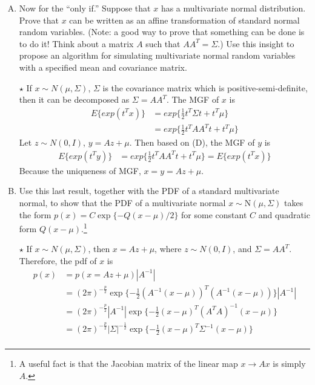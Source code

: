 \documentclass[11pt]{article}
\newcommand{\jie}{$\star$ }
\newcommand{\half}{\frac{1}{2}}
\newcommand{\N}{\mbox{N}}
\begin{document}
\begin{enumerate}[(A)]
\bigskip

\item Now for the ``only if.''  Suppose that $x$ has a multivariate normal distribution.  Prove that $x$ can be written as an affine transformation of standard normal random variables.  (Note: a good way to prove that something can be done is to do it!  Think about a matrix $A$ such that $A A^T = \Sigma$.)  Use this insight to propose an algorithm for simulating multivariate normal random variables with a specified mean and covariance matrix.

\bigskip

\jie
If $x \sim N(\mu,\Sigma)$, $\Sigma$ is the covariance matrix which is positive-semi-definite, then it can be decomposed as $\Sigma = AA^T$. The MGF of $x$ is
\begin{align*}
	E\{ exp(t^T x) \} &= exp\{ \half t^T \Sigma t+t^T\mu \} \\
	&= exp\{ \half t^T AA^T t+t^T\mu \} 
\end{align*}
Let $z \sim N(0,I)$, $y = Az+\mu$. Then based on (D), the MGF of $y$ is 
\begin{align*}
	E\{ exp(t^T y) \} &= exp\{ \half t^T AA^T t+t^T\mu \} = E\{ exp(t^T x) \}
\end{align*}
Because the uniqueness of MGF, $x=y= Az+\mu$.

\bigskip

\item Use this last result, together with the PDF of a standard multivariate normal, to show that the PDF of a multivariate normal $x \sim \N(\mu, \Sigma)$ takes the form $p(x) = C \exp\{-Q(x-\mu)/2\}$ for some constant $C$ and quadratic form $Q(x-\mu)$.\footnote{A useful fact is that the Jacobian matrix of the linear map $x \rightarrow Ax$ is simply $A$.}

\bigskip

\jie
If $x \sim N(\mu, \Sigma)$, then $x = A z + \mu$, where $z \sim N(0, I)$, and $\Sigma =  AA^T$.
Therefore, the pdf of $x$ is
\begin{align*}
    p(x) &= p(x= A z + \mu) |A^{-1}| \\
    &= (2\pi)^{-\frac{p}{2}} \exp \{ -\half (A^{-1}(x-\mu))^T(A^{-1}(x-\mu)) \} |A^{-1}| \\
    &= (2\pi)^{-\frac{p}{2}} |A^{-1}| \exp \{ -\half (x-\mu)^T (A^TA)^{-1} (x-\mu) \}  \\
    &= (2\pi)^{-\frac{p}{2}} |\Sigma|^{-\half} \exp \{ -\half (x-\mu)^T \Sigma^{-1} (x-\mu) \}  \\
\end{align*}


\end{enumerate}
\end{document}
